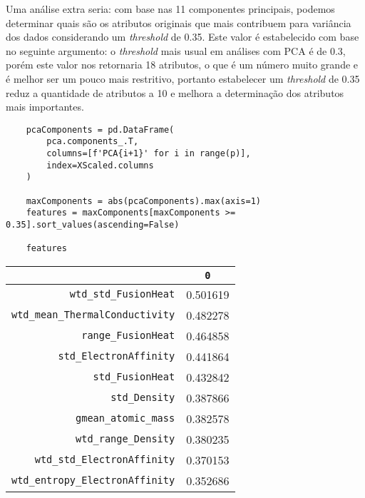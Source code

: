 Uma análise extra seria: com base nas 11 componentes principais, podemos determinar quais são os atributos originais que mais contribuem para variância dos dados considerando um \textit{threshold} de 0.35. Este valor é estabelecido com base no seguinte argumento: o \textit{threshold} mais usual em análises com PCA é de 0.3, porém este valor nos retornaria 18 atributos, o que é um número muito grande e é melhor ser um pouco mais restritivo, portanto estabelecer um \textit{threshold} de 0.35 reduz a quantidade de atributos a 10 e melhora a determinação dos atributos mais importantes.
\begin{longlisting}
    \begin{verbatim}
    pcaComponents = pd.DataFrame(
        pca.components_.T,
        columns=[f'PCA{i+1}' for i in range(p)],
        index=XScaled.columns
    )

    maxComponents = abs(pcaComponents).max(axis=1)
    features = maxComponents[maxComponents >= 0.35].sort_values(ascending=False)

    features
    \end{verbatim}
\end{longlisting}
\begin{table}[H]
    \centering
    \begin{tabular}{rc}
        \toprule
         & \verb|0| \\ 
        \midrule
        \verb|wtd_std_FusionHeat| & 0.501619 \\
        \verb|wtd_mean_ThermalConductivity| & 0.482278 \\
        \verb|range_FusionHeat| & 0.464858 \\
        \verb|std_ElectronAffinity| & 0.441864 \\
        \verb|std_FusionHeat| & 0.432842 \\
        \verb|std_Density| & 0.387866 \\
        \verb|gmean_atomic_mass| & 0.382578 \\
        \verb|wtd_range_Density| & 0.380235 \\
        \verb|wtd_std_ElectronAffinity| & 0.370153 \\
        \verb|wtd_entropy_ElectronAffinity| & 0.352686 \\
        \bottomrule
    \end{tabular}
\end{table}